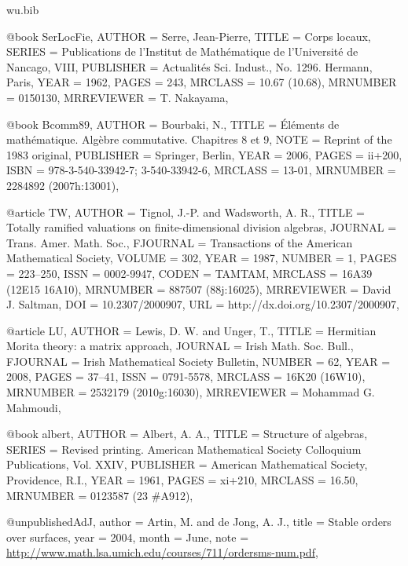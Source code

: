 \documentclass{amsart}
\numberwithin{equation}{section}
\theoremstyle{plain}
\theoremstyle{definition}
\begin{document}
\begin{filecontents}{wu.bib}
	
	@book {SerLocFie,
		AUTHOR = {Serre, Jean-Pierre},
		TITLE = {Corps locaux},
		SERIES = {Publications de l'Institut de Math\'ematique de l'Universit\'e
			de Nancago, VIII},
		PUBLISHER = {Actualit\'es Sci. Indust., No. 1296. Hermann, Paris},
		YEAR = {1962},
		PAGES = {243},
		MRCLASS = {10.67 (10.68)},
		MRNUMBER = {0150130},
		MRREVIEWER = {T. Nakayama},
	}
	
	
	
@book {Bcomm89, 
    AUTHOR = {Bourbaki, N.},
     TITLE = {\'{E}l\'ements de math\'ematique. {A}lg\`ebre commutative.
              {C}hapitres 8 et 9},
      NOTE = {Reprint of the 1983 original},
 PUBLISHER = {Springer, Berlin},
      YEAR = {2006},
     PAGES = {ii+200},
      ISBN = {978-3-540-33942-7; 3-540-33942-6},
   MRCLASS = {13-01},
  MRNUMBER = {2284892 (2007h:13001)},
}

@article {TW, 
    AUTHOR = {Tignol, J.-P. and Wadsworth, A. R.},
     TITLE = {Totally ramified valuations on finite-dimensional division
              algebras},
   JOURNAL = {Trans. Amer. Math. Soc.},
  FJOURNAL = {Transactions of the American Mathematical Society},
    VOLUME = {302},
      YEAR = {1987},
    NUMBER = {1},
     PAGES = {223--250},
      ISSN = {0002-9947},
     CODEN = {TAMTAM},
   MRCLASS = {16A39 (12E15 16A10)},
  MRNUMBER = {887507 (88j:16025)},
MRREVIEWER = {David J. Saltman},
       DOI = {10.2307/2000907},
       URL = {http://dx.doi.org/10.2307/2000907},
}

@article {LU, 
    AUTHOR = {Lewis, D. W. and Unger, T.},
     TITLE = {Hermitian {M}orita theory: a matrix approach},
   JOURNAL = {Irish Math. Soc. Bull.},
  FJOURNAL = {Irish Mathematical Society Bulletin},
    NUMBER = {62},
      YEAR = {2008},
     PAGES = {37--41},
      ISSN = {0791-5578},
   MRCLASS = {16K20 (16W10)},
  MRNUMBER = {2532179 (2010g:16030)},
MRREVIEWER = {Mohammad G. Mahmoudi},
}

@book {albert, 
    AUTHOR = {Albert, A. A.},
     TITLE = {Structure of algebras},
    SERIES = {Revised printing. American Mathematical Society Colloquium
              Publications, Vol. XXIV},
 PUBLISHER = {American Mathematical Society, Providence, R.I.},
      YEAR = {1961},
     PAGES = {xi+210},
   MRCLASS = {16.50},
  MRNUMBER = {0123587 (23 \#A912)},
}


@unpublished{AdJ,
	author	= {Artin, M. and de Jong, A. J.},
	title	= {Stable orders over surfaces}, 
	year	= {2004},
	month	= {June},
	note	= {\url{http://www.math.lsa.umich.edu/courses/711/ordersms-num.pdf}},
}





\end{filecontents}
\end{document}
